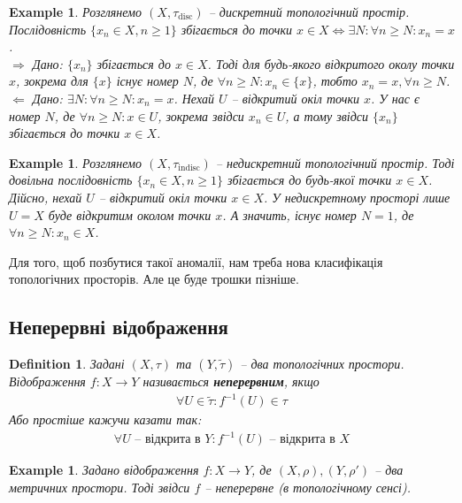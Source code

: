 \documentclass[a4paper, 10pt]{article}
\def\rightproof{$\boxed{\Rightarrow}$ }
\def\leftproof{$\boxed{\Leftarrow}$ }
\theoremstyle{theoremdd}
\newtheorem{definition}[theorem]{Definition}
\newtheorem{example}[theorem]{Example}
\begin{document}
\begin{example}
Розглянемо $(X,\tau_{\text{disc}})$ -- дискретний топологічний простір.\\
Послідовність $\{x_n \in X, n \geq 1\}$ збігається до точки $x \in X \iff \exists N: \forall n \geq N: x_n = x$.\\
\rightproof Дано: $\{x_n\}$ збігається до $x \in X$. Тоді для будь-якого відкритого околу точки $x$, зокрема для $\{x\}$ існує номер $N$, де $\forall n \geq N: x_n \in \{x\}$, тобто $x_n = x, \forall n \geq N$.
\bigskip \\
\leftproof Дано: $\exists N: \forall n \geq N: x_n = x$. Нехай $U$ -- відкритий окіл точки $x$. У нас є номер $N$, де $\forall n \geq N: x \in U$, зокрема звідси $x_n \in U$, а тому звідси $\{x_n\}$ збігається до точки $x \in X$.
\end{example}

\begin{example}
Розглянемо $(X,\tau_{\text{indisc}})$ -- недискретний топологічний простір. Тоді довільна послідовність $\{x_n \in X, n \geq 1\}$ збігається до будь-якої точки $x \in X$.\\
Дійсно, нехай $U$ -- відкритий окіл точки $x \in X$. У недискретному просторі лише $U = X$ буде відкритим околом точки $x$. А значить, існує номер $N =1$, де $\forall n \geq N: x_n \in X$.
\end{example}

\noindent Для того, щоб позбутися такої аномалії, нам треба нова класифікація топологічних просторів. Але це буде трошки пізніше.

\subsection{Неперервні відображення}
\begin{definition}
Задані $(X,\tau)$ та $(Y,\tilde{\tau})$ -- два топологічних простори.\\
Відображення $f \colon X \to Y$ називається \textbf{неперервним}, якщо
\begin{align*}
\forall U \in \tilde{\tau} : f^{-1}(U) \in \tau
\end{align*}
Або простіше кажучи казати так:
\begin{align*}
\forall U \text{ -- відкрита в } Y: f^{-1}(U) \text{ -- відкрита в } X
\end{align*}
\end{definition}

\begin{example}
Задано відображення $f \colon X \to Y$, де $(X,\rho), (Y,\rho')$ -- два метричних простори. Тоді звідси $f$ -- неперервне (в топологічному сенсі).
\end{example}
\end{document}

